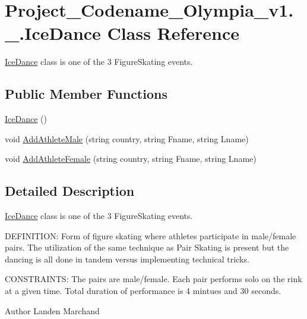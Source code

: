 \hypertarget{classProject__Codename__Olympia__v1_1_1__0_1_1IceDance}{}\section{Project\+\_\+\+Codename\+\_\+\+Olympia\+\_\+v1.\+\_.\+Ice\+Dance Class Reference}
\label{classProject__Codename__Olympia__v1_1_1__0_1_1IceDance}


\hyperlink{classProject__Codename__Olympia__v1_1_1__0_1_1IceDance}{Ice\+Dance} class is one of the 3 Figure\+Skating events.  


\subsection*{Public Member Functions}
\begin{DoxyCompactItemize}
\item 
\hyperlink{classProject__Codename__Olympia__v1_1_1__0_1_1IceDance_a38ad77c543afbb217c4ba378a14a0427}{Ice\+Dance} ()
\item 
void \hyperlink{classProject__Codename__Olympia__v1_1_1__0_1_1IceDance_afc459d686d210523e2ce4a23214f4af2}{Add\+Athlete\+Male} (string country, string Fname, string Lname)
\item 
void \hyperlink{classProject__Codename__Olympia__v1_1_1__0_1_1IceDance_a528bb9a075cc030a140064ff4568eafe}{Add\+Athlete\+Female} (string country, string Fname, string Lname)
\end{DoxyCompactItemize}


\subsection{Detailed Description}
\hyperlink{classProject__Codename__Olympia__v1_1_1__0_1_1IceDance}{Ice\+Dance} class is one of the 3 Figure\+Skating events. 

D\+E\+F\+I\+N\+I\+T\+I\+ON\+: Form of figure skating where athletes participate in male/female pairs. The utilization of the same technique as Pair Skating is present but the dancing is all done in tandem versus implementing technical tricks.

C\+O\+N\+S\+T\+R\+A\+I\+N\+TS\+: The pairs are male/female. Each pair performs solo on the rink at a given time. Total duration of performance is 4 mintues and 30 seconds.\begin{DoxyAuthor}{Author}
Landen Marchand 
\end{DoxyAuthor}


